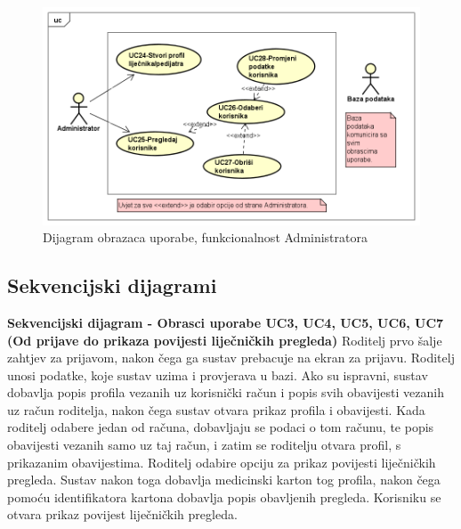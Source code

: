 					\begin{figure}[H]
						\includegraphics[scale=0.5]{dijagrami/usecase3.PNG} %
						\centering
						\caption{Dijagram obrazaca uporabe, funkcionalnost Administratora}
						\label{fig:usecase3}
					\end{figure}
				\eject		
				
			\subsection{Sekvencijski dijagrami}
				\textbf{Sekvencijski dijagram - Obrasci uporabe UC3, UC4, UC5, UC6, UC7 (Od prijave do prikaza povijesti liječničkih pregleda)}\newline
					\text Roditelj prvo šalje zahtjev za prijavom, nakon čega ga sustav prebacuje na ekran za prijavu. Roditelj unosi podatke, koje sustav uzima i provjerava u bazi. Ako su ispravni, sustav dobavlja popis profila vezanih uz korisnički račun i popis svih obavijesti vezanih uz račun roditelja, nakon čega sustav otvara prikaz profila i obavijesti. Kada roditelj odabere jedan od računa, dobavljaju se podaci o tom računu, te popis obavijesti vezanih samo uz taj račun, i zatim se roditelju otvara profil, s prikazanim obavijestima. Roditelj odabire opciju za prikaz povijesti liječničkih pregleda. Sustav nakon toga dobavlja medicinski karton tog profila, nakon čega pomoću identifikatora kartona dobavlja popis obavljenih pregleda. Korisniku se otvara prikaz povijest liječničkih pregleda. \\
					
